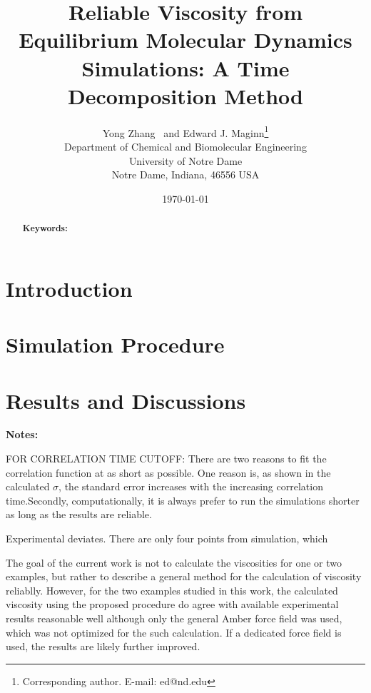 \documentclass[12pt]{article}
\title{Reliable Viscosity from Equilibrium Molecular Dynamics Simulations: A Time Decomposition Method}
\author{Yong Zhang \ and Edward J. Maginn\thanks{Corresponding author. E-mail: ed@nd.edu} \\
                Department of Chemical and Biomolecular Engineering\\
                University of Notre Dame\\
                Notre Dame, Indiana, 46556 USA}
\date{\today}
\begin{document}

\maketitle

\newpage
\begin{abstract}


{\bf Keywords:} 

\end{abstract}

\newpage
\section{Introduction}



\section{Simulation Procedure}

\section{Results and Discussions}

{\bf Notes:

FOR CORRELATION TIME CUTOFF: There are two reasons to fit the correlation function at as short as possible.
One reason is, as shown in the calculated $\sigma$, the standard error increases with the increasing correlation time.Secondly, computationally, it is always prefer to run the simulations shorter as long as the results are reliable.

Experimental deviates.
There are only four points from simulation, which 

The goal of the current work is not to calculate the viscosities for one or two examples,
but rather to describe a general method for the calculation of viscosity reliablly.
However, for the two examples studied in this work,
the calculated viscosity using the proposed procedure
do agree with available experimental results reasonable well
although only the general Amber force field was used,
which was not optimized for the such calculation.
If a dedicated force field is used,
the results are likely further improved.}
\end{document}
